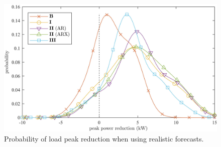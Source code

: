 \begin{figure}\centering
	\includegraphics{_chapter2/fig/difference-pdf-1-avg}
	\caption{Probability of load peak reduction when using realistic forecasts.}
	\label{ch2:fig:peak-diff-pdf}
\end{figure}